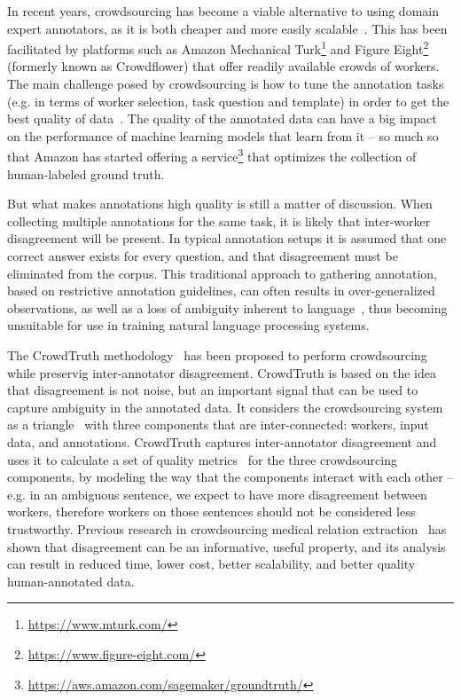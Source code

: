 In recent years, crowdsourcing has become a viable alternative to using domain expert annotators, as it is both cheaper and more easily scalable~\cite{Sabou:2012:CRO:2362456.2362479}. This has been facilitated by platforms such as Amazon Mechanical Turk\footnote{\url{https://www.mturk.com/}} and Figure Eight\footnote{\url{https://www.figure-eight.com/}} (formerly known as Crowdflower) that offer readily available crowds of workers. The main challenge posed by crowdsourcing is how to tune the annotation tasks (e.g. in terms of worker selection, task question and template) in order to get the best quality of data~\cite{Difallah2012}. The quality of the annotated data can have a big impact on the performance of machine learning models that learn from it -- so much so that Amazon has started offering a service\footnote{\url{https://aws.amazon.com/sagemaker/groundtruth/}} that optimizes the collection of human-labeled ground truth.

But what makes annotations high quality is still a matter of discussion. When collecting multiple annotations for the same task, it is likely that inter-worker disagreement will be present. In typical annotation setups it is assumed that one correct answer exists for every question, and that disagreement must be eliminated from the corpus. This traditional approach to gathering annotation, based on restrictive annotation guidelines, can often results in over-generalized observations, as well as a loss of ambiguity inherent to language~\cite{aroyo2012harnessing}, thus becoming unsuitable for use in training natural language processing systems. %

The CrowdTruth methodology~\cite{aroyo2015truth,aroyo2013crowd} has been proposed to perform crowdsourcing while preservig inter-annotator disagreement. CrowdTruth is based on the idea~\cite{aroyo2015truth} that disagreement is not noise, but an important signal that can be used to capture ambiguity in the annotated data. It considers the crowdsourcing system as a triangle~\cite{aroyo2014threesides} with three components that are inter-connected: workers, input data, and annotations. CrowdTruth captures inter-annotator disagreement and uses it to calculate a set of quality metrics~\cite{inel2013,dumitrache2018crowdtruth} for the three crowdsourcing components, by modeling the way that the components interact with each other -- e.g. in an ambiguous sentence, we expect to have more disagreement between workers, therefore workers on those sentences should not be considered less trustworthy. Previous research in crowdsourcing medical relation extraction~\cite{aroyo2013crowd,aroyo2013measuring} has shown that disagreement can be an informative, useful property, and its analysis can result in reduced time, lower cost, better scalability, and better quality human-annotated data.

